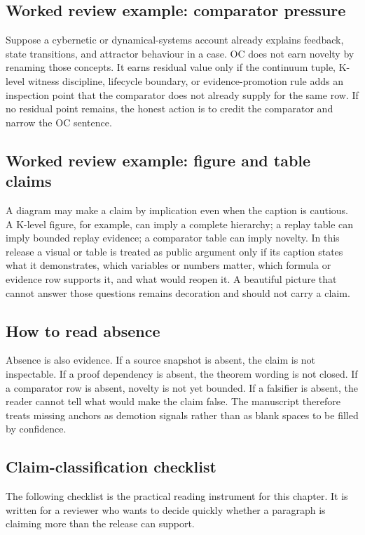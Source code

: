\subsection{Worked review example: comparator pressure}

Suppose a cybernetic or dynamical-systems account already explains feedback,
state transitions, and attractor behaviour in a case. OC does not earn novelty
by renaming those concepts. It earns residual value only if the continuum tuple,
K-level witness discipline, lifecycle boundary, or evidence-promotion rule
adds an inspection point that the comparator does not already supply for the
same row. If no residual point remains, the honest action is to credit the
comparator and narrow the OC sentence.

\subsection{Worked review example: figure and table claims}

A diagram may make a claim by implication even when the caption is cautious. A
K-level figure, for example, can imply a complete hierarchy; a replay table can
imply bounded replay evidence; a comparator table can imply novelty. In this
release a visual or table is treated as public argument only if its caption
states what it demonstrates, which variables or numbers matter, which formula
or evidence row supports it, and what would reopen it. A beautiful picture that
cannot answer those questions remains decoration and should not carry a claim.

\subsection{How to read absence}

Absence is also evidence. If a source snapshot is absent, the claim is not
inspectable. If a proof dependency is absent, the theorem wording is not
closed. If a comparator row is absent, novelty is not yet bounded. If a
falsifier is absent, the reader cannot tell what would make the claim false.
The manuscript therefore treats missing anchors as demotion signals rather than
as blank spaces to be filled by confidence.

\subsection{Claim-classification checklist}

The following checklist is the practical reading instrument for this chapter.
It is written for a reviewer who wants to decide quickly whether a paragraph is
claiming more than the release can support.

